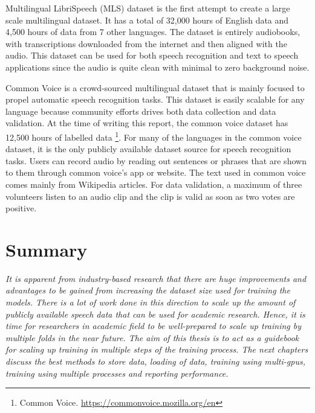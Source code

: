 Multilingual LibriSpeech (MLS) dataset is the first attempt to create a large scale multilingual dataset. It has a total of 32,000 hours of English data and 4,500 hours of data from 7 other languages. The dataset is entirely audiobooks, with  transcriptions downloaded from the internet and then aligned with the audio. This dataset can be used for both speech recognition and text to speech applications since the audio is quite clean with minimal to zero background noise. 

Common Voice \cite{Ardila2020CommonCorpus} is a crowd-sourced multilingual dataset that is mainly focused to propel automatic speech recognition tasks. This dataset is easily scalable for any language because community efforts drives both data collection and data validation. At the time of writing this report, the common voice dataset has 12,500 hours of labelled data \footnote{Common Voice. \href{https://commonvoice.mozilla.org/en}{https://commonvoice.mozilla.org/en}}. For many of the languages in the common voice dataset, it is the only publicly available dataset source for speech recognition tasks. Users can record audio by reading out sentences or phrases that are shown to them through common voice's app or website. The text used in common voice comes mainly from Wikipedia articles. For data validation, a maximum of three volunteers listen to an audio clip and the clip is valid as soon as two votes are positive.

\section{Summary}
\emph{It is apparent from industry-based research that there are huge improvements and advantages to be gained from increasing the dataset size used for training the models. There is a lot of work done in this direction to scale up the amount of publicly available speech data that can be used for academic research. Hence, it is time for researchers in academic field to be well-prepared to scale up training by multiple folds in the near future. The aim of this thesis is to act as a guidebook for scaling up training in multiple steps of the training process. The next chapters discuss the best methods to store data, loading of data, training using multi-\acrshort{gpu}s, training using multiple processes and reporting performance.}

